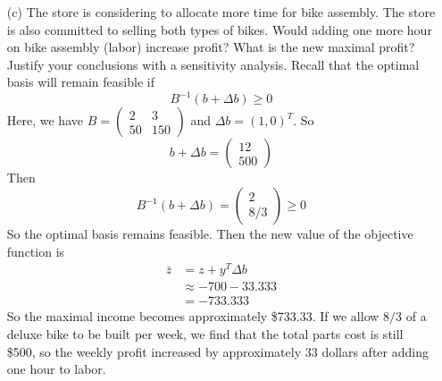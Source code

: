 \documentclass{article}
\begin{document}
\begin{itemize}
\begin{itemize}
        \item[(c)] The store is considering to allocate more time for bike assembly. The store is also committed to selling both types of bikes. Would adding one more hour on bike assembly (labor) increase profit? What is the new maximal profit? Justify your conclusions with a sensitivity analysis.
        \newline\newline
        Recall that the optimal basis will remain feasible if
        \[B^{-1}(b + \Delta b) \geq 0\]
        Here, we have $B = \begin{pmatrix} 2 & 3\\ 50 & 150 \end{pmatrix}$ and $\Delta b = (1,0)^T$. So 
        \[b + \Delta b = \begin{pmatrix}
            12\\
            500
        \end{pmatrix}\]
        Then
        \[B^{-1}(b + \Delta b) = \begin{pmatrix}
            2\\
            8/3
        \end{pmatrix} \geq 0\]
        So the optimal basis remains feasible. Then the new value of the objective function is
        \begin{align*}
            \bar{z} &= z + y^T\Delta b\\
            &\approx -700 - 33.333\\
            &= -733.333
        \end{align*}
        So the maximal income becomes approximately \$733.33. If we allow $8/3$ of a deluxe bike to be built per week, we find that the total parts cost is still \$500, so the weekly profit increased by approximately 33 dollars after adding one hour to labor.
    \end{itemize}


\end{itemize}
\end{document}
